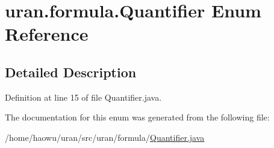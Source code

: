 \hypertarget{enumuran_1_1formula_1_1_quantifier}{}\section{uran.\+formula.\+Quantifier Enum Reference}
\label{enumuran_1_1formula_1_1_quantifier}


\subsection{Detailed Description}


Definition at line 15 of file Quantifier.\+java.



The documentation for this enum was generated from the following file\+:\begin{DoxyCompactItemize}
\item 
/home/haowu/uran/src/uran/formula/\hyperlink{_quantifier_8java}{Quantifier.\+java}\end{DoxyCompactItemize}
